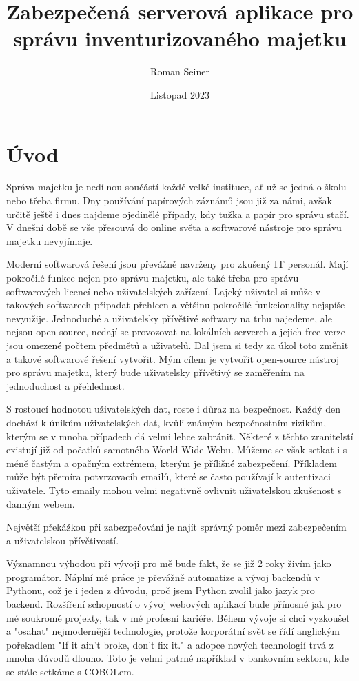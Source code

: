 \documentclass[12pt, a4paper]{article}
\title{Zabezpečená serverová aplikace pro správu inventurizovaného majetku}
\author{Roman Seiner}
\date{Listopad 2023}
\begin{document}
\maketitle

\tableofcontents


\clearpage

\section*{Úvod}
Správa majetku je nedílnou součástí každé velké instituce, ať už se jedná o školu nebo třeba firmu. Dny používání papírových záznámů jsou již za námi, avšak určitě ještě i dnes najdeme ojedinělé případy, kdy tužka a papír pro správu stačí. V dnešní době se vše přesouvá do online světa a softwarové nástroje pro správu majetku nevyjímaje.

Moderní softwarová řešení jsou převážně navrženy pro zkušený IT personál. Mají pokročilé funkce nejen pro správu majetku, ale také třeba pro správu softwarových licencí nebo uživatelských zařízení. Lajcký uživatel si může v takových softwarech připadat přehlcen a většinu pokročilé funkcionality nejspíše nevyužije. Jednoduché a uživatelsky přívětivé softwary na trhu najedeme, ale nejsou open-source, nedají se provozovat na lokálních serverch a jejich free verze jsou omezené počtem předmětů a uživatelů. Dal jsem si tedy za úkol toto změnit a takové softwarové řešení vytvořit. Mým cílem je vytvořit open-source nástroj pro správu majetku, který bude uživatelsky přívětivý se zaměřením na jednoduchost a přehlednost.

S rostoucí hodnotou uživatelských dat, roste i důraz na bezpečnost. Každý den dochází k únikům uživatelských dat, kvůli známým bezpečnostním rizikům, kterým se v mnoha případech dá velmi lehce zabránit. Některé z těchto zranitelstí existují již od počatků samotného World Wide Webu. Můžeme se však setkat i s méně častým a opačným extrémem, kterým je přílišné zabezpečení. Příkladem může být přemíra potvrzovacíh emailů, které se často používají k autentizaci uživatele. Tyto emaily mohou velmi negativně ovlivnit uživatelskou zkušenost s danným webem.

Největší překážkou při zabezpečování je najít správný poměr mezi zabezpečením a uživatelskou přívětivostí.

Významnou výhodou při vývoji pro mě bude fakt, že se již 2 roky živím jako programátor. Náplní mé práce je převážně automatize a vývoj backendů v Pythonu, což je i jeden z důvodu, proč jsem Python zvolil jako jazyk pro backend. Rozšíření schopností o vývoj webových aplikací bude přínosné jak pro mé soukromé projekty, tak v mé profesní kariéře. Během vývoje si chci vyzkoušet a "osahat" nejmodernější technologie, protože korporátní svět se řídí anglickým pořekadlem "If it ain't broke, don't fix it." a adopce nových technologií trvá z mnoha důvodů dlouho. Toto je velmi patrné například v bankovním sektoru, kde se stále setkáme s COBOLem.
\clearpage
\end{document}
